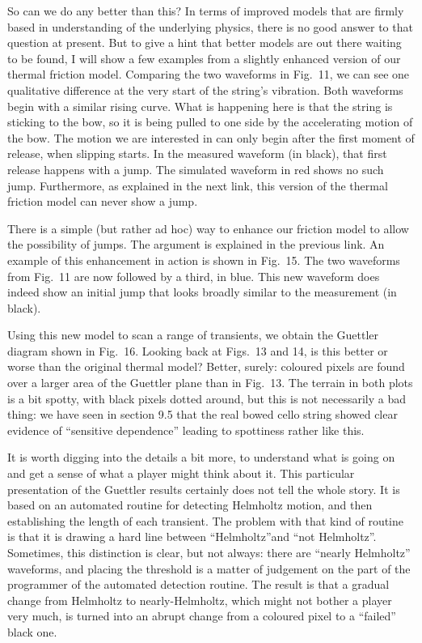   So can we do any better than this? In terms of improved models that are 
  firmly based in understanding of the underlying physics, there is no good 
  answer to that question at present. But to give a hint that better models are 
  out there waiting to be found, I will show a few examples from a slightly 
  enhanced version of our thermal friction model. Comparing the two waveforms 
  in Fig.\ 11, we can see one qualitative difference at the very start of the 
  string's vibration. Both waveforms begin with a similar rising curve. What is 
  happening here is that the string is sticking to the bow, so it is being 
  pulled to one side by the accelerating motion of the bow. The motion we are 
  interested in can only begin after the first moment of release, when slipping 
  starts. In the measured waveform (in black), that first release happens with 
  a jump. The simulated waveform in red shows no such jump. Furthermore, as 
  explained in the next link, this version of the thermal friction model can 
  never show a jump. 

  There is a simple (but rather ad hoc) way to enhance our friction model to 
  allow the possibility of jumps. The argument is explained in the previous 
  link. An example of this enhancement in action is shown in Fig.\ 15. The two 
  waveforms from Fig.\ 11 are now followed by a third, in blue. This new 
  waveform does indeed show an initial jump that looks broadly similar to the 
  measurement (in black). 

  Using this new model to scan a range of transients, we obtain the Guettler 
  diagram shown in Fig.\ 16. Looking back at Figs.\ 13 and 14, is this better 
  or worse than the original thermal model? Better, surely: coloured pixels are 
  found over a larger area of the Guettler plane than in Fig.\ 13. The terrain 
  in both plots is a bit spotty, with black pixels dotted around, but this is 
  not necessarily a bad thing: we have seen in section 9.5 that the real bowed 
  cello string showed clear evidence of ``sensitive dependence'' leading to 
  spottiness rather like this. 

  It is worth digging into the details a bit more, to understand what is going 
  on and get a sense of what a player might think about it. This particular 
  presentation of the Guettler results certainly does not tell the whole story. 
  It is based on an automated routine for detecting Helmholtz motion, and then 
  establishing the length of each transient. The problem with that kind of 
  routine is that it is drawing a hard line between “Helmholtz”and “not 
  Helmholtz”. Sometimes, this distinction is clear, but not always: there are 
  “nearly Helmholtz” waveforms, and placing the threshold is a matter of 
  judgement on the part of the programmer of the automated detection routine. 
  The result is that a gradual change from Helmholtz to nearly-Helmholtz, which 
  might not bother a player very much, is turned into an abrupt change from a 
  coloured pixel to a ``failed'' black one. 

